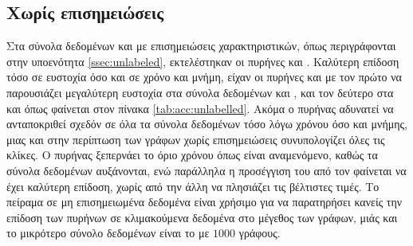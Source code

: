 \subsection{Χωρίς επισημειώσεις}
Στα σύνολα δεδομένων  και  με επισημειώσεις χαρακτηριστικών, όπως περιγράφονται στην υποενότητα \ref{ssec:unlabeled}, εκτελέστηκαν οι πυρήνες 
 και .
Καλύτερη επίδοση τόσο σε ευστοχία όσο και σε χρόνο και μνήμη, είχαν οι πυρήνες  και  με τον πρώτο να παρουσιάζει μεγαλύτερη ευστοχία στα σύνολα δεδομένων  και ,  και τον δεύτερο στα  και  όπως φαίνεται στον πίνακα \ref{tab:acc:unlabelled}.
Ακόμα ο πυρήνας  αδυνατεί να ανταποκριθεί σχεδόν σε όλα τα σύνολα δεδομένων τόσο λόγω χρόνου όσο και μνήμης, μιας και στην περίπτωση των γράφων χωρίς επισημειώσεις συνυπολογίζει όλες τις κλίκες.
Ο πυρήνας  ξεπερνάει το όριο χρόνου όπως είναι αναμενόμενο, καθώς τα σύνολα δεδομένων αυξάνονται, ενώ παράλληλα η προσέγγιση του από τον  φαίνεται να έχει καλύτερη επίδοση, χωρίς από την άλλη να πλησιάζει τις βέλτιστες τιμές.
Το πείραμα σε μη επισημειωμένα δεδομένα είναι χρήσιμο για να παρατηρήσει κανείς την επίδοση των πυρήνων σε κλιμακούμενα δεδομένα στο μέγεθος των γράφων, μιάς και το μικρότερο σύνολο δεδομένων είναι το  με $1000$ γράφους.
